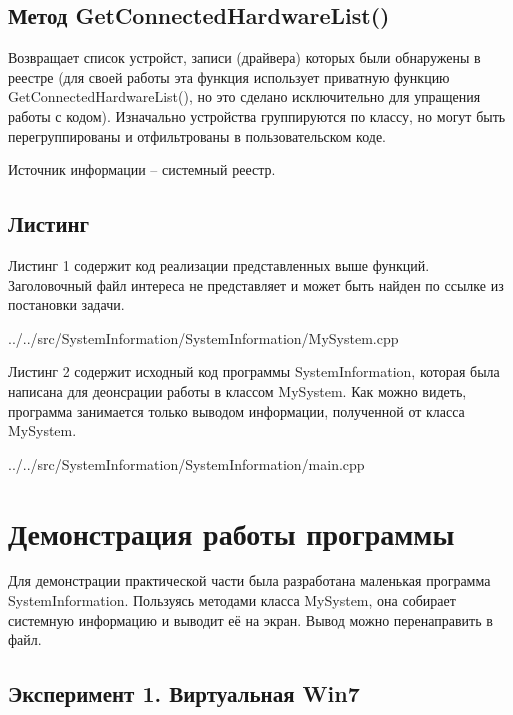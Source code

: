 \documentclass[a4paper, 12pt]{report}		%
\begin{document}
\section*{Метод GetConnectedHardwareList()}
Возвращает список устройст, записи (драйвера) которых были обнаружены в реестре (для своей работы эта функция использует приватную функцию GetConnectedHardwareList(), но это сделано исключительно для упращения работы с кодом). Изначально устройства группируются по классу, но могут быть перегруппированы и отфильтрованы в пользовательском коде.

Источник информации -- системный реестр.

\section*{Листинг}
Листинг 1 содержит код реализации представленных выше функций. Заголовочный файл интереса не представляет и может быть найден по ссылке из постановки задачи.


{../../src/SystemInformation/SystemInformation/MySystem.cpp}

Листинг 2 содержит исходный код программы SystemInformation, которая была написана для деонсрации работы в классом MySystem. Как можно видеть, программа занимается только выводом информации, полученной от класса MySystem.


{../../src/SystemInformation/SystemInformation/main.cpp}

\chapter*{Демонстрация работы программы}

\vspace{1em}

Для демонстрации практической части была разработана маленькая программа SystemInformation. Пользуясь методами класса MySystem, она собирает системную информацию и выводит её на экран. Вывод можно перенаправить в файл.

\section*{Эксперимент 1. Виртуальная Win7}
\end{document}
